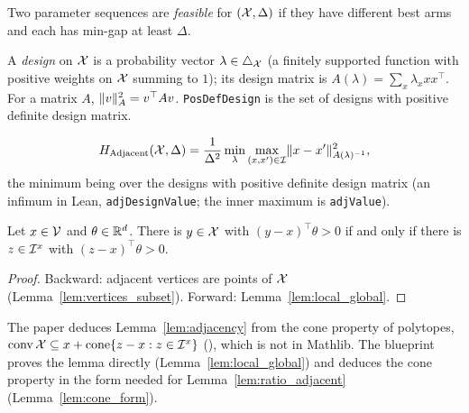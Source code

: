 \begin{definition}
  \label{def:feasible}
  \leanok
  Two parameter sequences are \emph{feasible} for $(\mathcal{X}, \Delta)$ if they have different best arms
  and each has min-gap at least $\Delta$.
\end{definition}

\begin{definition}
  \label{def:design}
  \leanok
  A \emph{design} on $\mathcal{X}$ is a probability vector $\lambda \in \triangle_{\mathcal{X}}$ (a finitely supported
  function with positive weights on $\mathcal{X}$ summing to $1$); its design matrix is
  $A(\lambda) = \sum_{x} \lambda_x x x^\top$. For a matrix $A$, $\lVert v \rVert_A^2 = v^\top A v$.
  \texttt{PosDefDesign} is the set of designs with positive definite design matrix.
\end{definition}

\begin{definition}
  \label{def:h_adjacent}
  \leanok
  \[
    H_{\mathrm{Adjacent}}(\mathcal{X}, \Delta) = \frac{1}{\Delta^2} \min_{\lambda} \max_{(x, x') \in \mathcal{I}}
      \lVert x - x' \rVert^2_{A(\lambda)^{-1}},
  \]
  the minimum being over the designs with positive definite design matrix (an infimum in Lean,
  \texttt{adjDesignValue}; the inner maximum is \texttt{adjValue}).
\end{definition}

\begin{lemma}
  \label{lem:adjacency}
  \leanok
  Let $x \in \mathcal{V}$ and $\theta \in \mathbb{R}^d$. There is $y \in \mathcal{X}$ with $(y - x)^\top \theta > 0$ if and
  only if there is $z \in \mathcal{I}^x$ with $(z - x)^\top \theta > 0$.
\end{lemma}

\begin{proof}
  \leanok
  Backward: adjacent vertices are points of $\mathcal{X}$ (Lemma~\ref{lem:vertices_subset}). Forward:
  Lemma~\ref{lem:local_global}.
\end{proof}

\begin{remark}
  The paper deduces Lemma~\ref{lem:adjacency} from the cone property of polytopes,
  $\operatorname{conv} \mathcal{X} \subseteq x + \operatorname{cone}\{z - x : z \in \mathcal{I}^x\}$ (\cite[Lemma 3.6]{ziegler1995lectures}),
  which is not in Mathlib. The blueprint proves the lemma directly
  (Lemma~\ref{lem:local_global}) and deduces the cone property in the form needed for
  Lemma~\ref{lem:ratio_adjacent} (Lemma~\ref{lem:cone_form}).
\end{remark}

